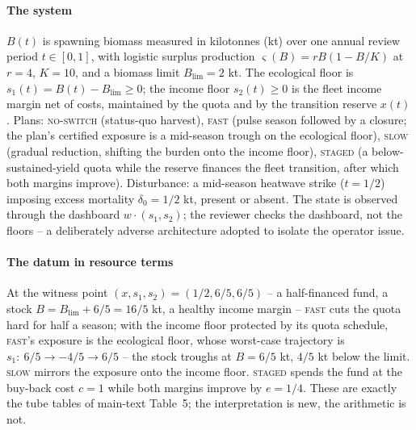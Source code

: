 \documentclass[preprint,11pt,authoryear]{elsarticle}
\theoremstyle{remark}
\newcommand{\act}[1]{\textsc{#1}}
\begin{document}
\paragraph{The system} $B(t)$ is spawning biomass measured in kilotonnes (kt) over one annual review period $t\in[0,1]$, with logistic surplus production $\varsigma(B)=rB(1-B/K)$ at $r=4$, $K=10$, and a biomass limit $B_{\mathrm{lim}}=2$ kt. The ecological floor is $s_1(t)=B(t)-B_{\mathrm{lim}}\ge0$; the income floor $s_2(t)\ge0$ is the fleet income margin net of costs, maintained by the quota and by the transition reserve $x(t)$. Plans: \act{no-switch} (status-quo harvest), \act{fast} (pulse season followed by a closure; the plan's certified exposure is a mid-season trough on the ecological floor), \act{slow} (gradual reduction, shifting the burden onto the income floor), \act{staged} (a below-sustained-yield quota while the reserve finances the fleet transition, after which both margins improve). Disturbance: a mid-season heatwave strike ($t=1/2$) imposing excess mortality $\delta_0=1/2$ kt, present or absent. The state is observed through the dashboard $w\cdot(s_1,s_2)$; the reviewer checks the dashboard, not the floors -- a deliberately adverse architecture adopted to isolate the operator issue.

\paragraph{The datum in resource terms} At the witness point $(x,s_1,s_2)=(1/2,6/5,6/5)$ -- a half-financed fund, a stock $B=B_{\mathrm{lim}}+6/5=16/5$ kt, a healthy income margin -- \act{fast} cuts the quota hard for half a season; with the income floor protected by its quota schedule, \act{fast}'s exposure is the ecological floor, whose worst-case trajectory is $s_1:\ 6/5\to-4/5\to6/5$ -- the stock troughs at $B=6/5$ kt, $4/5$ kt below the limit. \act{slow} mirrors the exposure onto the income floor. \act{staged} spends the fund at the buy-back cost $c=1$ while both margins improve by $e=1/4$. These are exactly the tube tables of main-text Table~5; the interpretation is new, the arithmetic is not.
\end{document}
